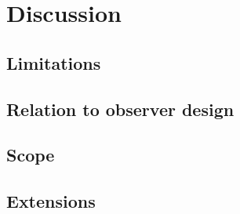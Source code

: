 
\section{Discussion}
\label{p2:sec:discussion}

\subsection{Limitations}
\label{p2:sub:limitations}

\subsection{Relation to observer design}
\label{p2:sub:relation_to_observer_design}

\subsection{Scope}
\label{p2:sub:scope}

\subsection{Extensions}
\label{p2:sub:extensions}

